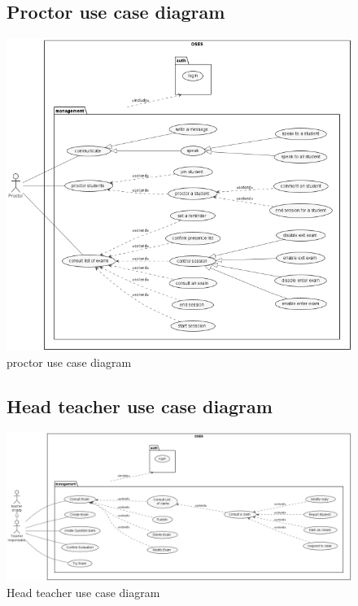 \documentclass[]{uc2pfecaneva}
\begin{document}
    \begin{figure}
        \subsection{Proctor use case diagram}
        \centering
        \includegraphics[width=\textwidth]{images/proctor_UCD}
        \caption{proctor use case diagram}
    \end{figure}


    \begin{figure}
        \subsection{Head teacher use case diagram}
        \centering
        \includegraphics[width=450pt]{images/Module_Teacher}
        \caption{Head teacher use case diagram}
    \end{figure}
\end{document}
